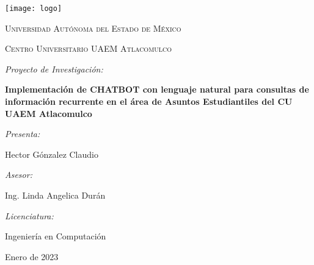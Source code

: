 
\begin{titlepage}
{\setlength{\parskip}{0cm}
\centering
{\texttt{[image: logo]}\par}
\vspace{0.5cm}
{\scshape\Large Universidad Autónoma del Estado de México \par}
\vspace{0.5cm}
{\scshape\Large Centro Universitario UAEM Atlacomulco \par}
\vfill
{\itshape\Large Proyecto de Investigación: \par}
{\bfseries\Large Implementaci\'on de CHATBOT con lenguaje natural para consultas de informaci\'on recurrente en el \'area de Asuntos Estudiantiles del CU UAEM Atlacomulco \par}
\vfill
{\itshape\Large Presenta: \par}
{\Large Hector G\'onzalez Claudio \par}
\vfill
{\itshape\Large Asesor: \par}
{\Large Ing. Linda Angelica Dur\'an \par}
\vfill
{\itshape\Large Licenciatura: \par}
{\Large Ingeniería en Computación \par}
\vfill
{\Large Enero de 2023 \par}
}
\end{titlepage} 

